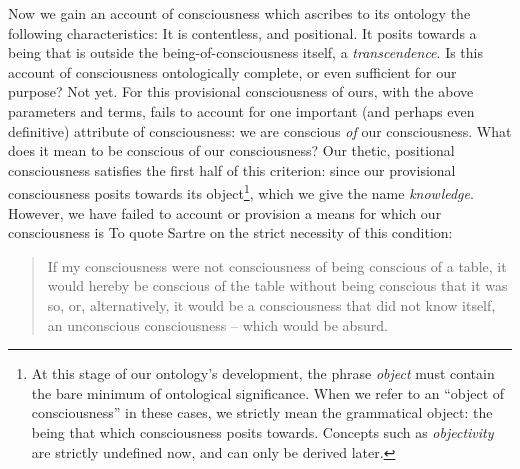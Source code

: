 
Now we gain an account of consciousness which ascribes to its ontology the following characteristics: It is contentless, and positional. It posits towards a being that is outside the being-of-consciousness itself, a \emph{transcendence}. Is this account of consciousness ontologically complete, or even sufficient for our purpose? Not yet. For this provisional consciousness of ours, with the above parameters and terms, fails to account for one important (and perhaps even definitive) attribute of consciousness: we are conscious \emph{of} our consciousness. What does it mean to be conscious of our consciousness?  Our thetic, positional consciousness satisfies the first half of this criterion: since our provisional consciousness posits towards its object\footnote{At this stage of our ontology's development, the phrase \emph{object} must contain the bare minimum of ontological significance. When we refer to an \enquote{object of consciousness} in these cases, we strictly mean the grammatical object: the being that which consciousness posits towards. Concepts such as \emph{objectivity} are strictly undefined now, and can only be derived later.}, which we give the name \emph{knowledge}. However, we have failed to account or provision a means for which our consciousness is  To quote Sartre on the strict necessity of this condition:

\blockcquote[10]{Sartre}{
    If my consciousness were not consciousness of being conscious of a table, it would hereby be conscious of the table without being conscious that it was so, or, alternatively, it would be a consciousness that did not know itself, an unconscious consciousness -- which would be absurd.
}

